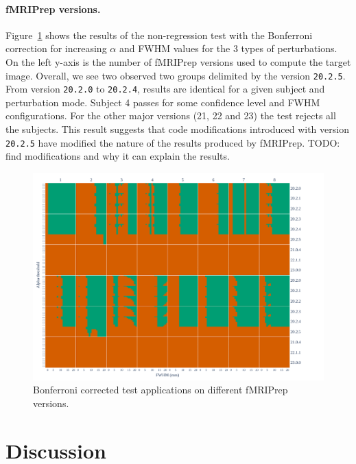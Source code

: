 \documentclass{article}
\newcommand{\TODO}[1]{\color{red}\textsc{TODO:} #1\color{black}\xspace}
\newcommand{\fmriprep}{fMRIPrep\xspace}
\begin{document}
\paragraph*{\fmriprep versions.} Figure~\ref{fig:version_bonferroni} shows the results of the non-regression test with the Bonferroni correction for increasing $\alpha$ and FWHM values for the 3 types of perturbations. On the left y-axis is the number of \fmriprep versions used to compute the target image. Overall, we see two observed two groups delimited by the version \texttt{20.2.5}. From version \texttt{20.2.0} to \texttt{20.2.4}, results are identical for a given subject and perturbation mode. Subject 4 passes for some confidence level and FWHM configurations. For the other major versions (21, 22 and 23) the test rejects all the subjects. This result suggests that code modifications introduced with version \texttt{20.2.5} have modified the nature of the results produced by \fmriprep. \TODO{find modifications and why it can explain the results}.

\begin{figure}
    \centering
    \includegraphics[width=\linewidth]{figures/fmriprep-versions/bonferroni.pdf}
    \caption{Bonferroni corrected test applications on different \fmriprep versions.}
    \label{fig:version_bonferroni}
\end{figure}


\section{Discussion}

\end{document}
